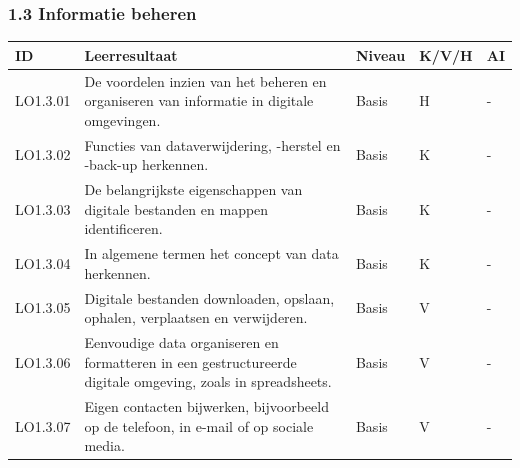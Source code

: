 \documentclass[
  dutch,
  letterpaper,
  DIV=11,
  numbers=noendperiod]{scrartcl}
\begin{document}
\subsubsection{1.3 Informatie beheren}\label{informatie-beheren}

\begin{longtable}[]{@{}
  >{\centering\arraybackslash}p{}
  >{\centering\arraybackslash}p{}
  >{\centering\arraybackslash}p{}
  >{\centering\arraybackslash}p{}
  >{\centering\arraybackslash}p{}@{}}
\toprule\noalign{}
\begin{minipage}[b]{\linewidth}\centering
ID
\end{minipage} & \begin{minipage}[b]{\linewidth}\centering
Leerresultaat
\end{minipage} & \begin{minipage}[b]{\linewidth}\centering
Niveau
\end{minipage} & \begin{minipage}[b]{\linewidth}\centering
K/V/H
\end{minipage} & \begin{minipage}[b]{\linewidth}\centering
AI
\end{minipage} \\
\midrule\noalign{}
\endhead
\bottomrule\noalign{}
\endlastfoot
LO1.3.01 & De voordelen inzien van het beheren en organiseren van
informatie in digitale omgevingen. & Basis & H & - \\
LO1.3.02 & Functies van dataverwijdering, -herstel en -back-up
herkennen. & Basis & K & - \\
LO1.3.03 & De belangrijkste eigenschappen van digitale bestanden en
mappen identificeren. & Basis & K & - \\
LO1.3.04 & In algemene termen het concept van data herkennen. & Basis &
K & - \\
LO1.3.05 & Digitale bestanden downloaden, opslaan, ophalen, verplaatsen
en verwijderen. & Basis & V & - \\
LO1.3.06 & Eenvoudige data organiseren en formatteren in een
gestructureerde digitale omgeving, zoals in spreadsheets. & Basis & V &
- \\
LO1.3.07 & Eigen contacten bijwerken, bijvoorbeeld op de telefoon, in
e-mail of op sociale media. & Basis & V & - \\

\end{longtable}
\end{document}
